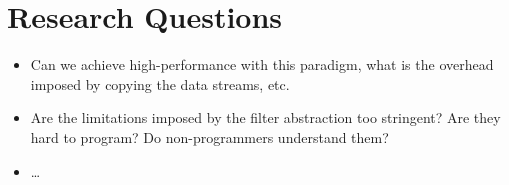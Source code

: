 \documentclass[10pt,notitlepage]{article}
\begin{document}
\section{Research Questions}

\begin{itemize}
  \item Can we achieve high-performance with this paradigm, what is
    the overhead imposed by copying the data streams, etc.

  \item Are the limitations imposed by the filter abstraction too
    stringent? Are they hard to program? Do non-programmers understand
    them?

  \item \dots
\end{itemize}
\end{document}

